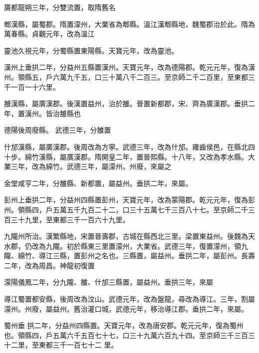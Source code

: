 \begin{pinyinscope}
 廣都龍朔三年，分雙流置，取隋舊名



 郫漢縣，屬蜀郡。隋置濛州，大業省為郫縣。溫江漢郫縣地，魏蜀郡治於此。隋為萬春縣。貞觀元年，改為溫江



 靈池久視元年，分蜀縣置東陽縣。天寶元年，改為靈池。



 漢州上垂拱二年，分益州五縣置漢州。天寶元年，改為德陽郡。乾元元年，復為漢州。領縣五，戶六萬九千五，口三十萬八千二百三。至京師二千二百里，至東都三千一百一十六里。



 雒漢縣，屬廣漢郡。後漢置益州，治於雒。晉置新都郡，宋、齊為廣漢郡。垂拱二年，置漢州。皆治雒縣也



 德陽後周廢縣。
 武德三年，分雒置



 什邡漢縣，屬廣漢郡。後周改為方寧。武德三年，改為什邡。雍齒侯邑，在縣北四十步。綿竹漢縣，屬廣漢郡。隋開皇二年，置晉熙縣。十八年，又改為孝水縣。大業三年，改為綿竹。武德三年，屬濛州。州廢，來屬之



 金堂咸亨二年，分雒縣、新都置，屬益州。垂拱二年，來屬。



 彭州上垂拱二年，分益州四縣置彭州，天寶元年，改為蒙陽郡。乾元元年，復為彭州。領縣四，戶五萬五千九百二十二，口三十五萬七千三百八十七。至京師二千三百三十九里，至東都三千一百六十九里。



 九隴州所治。漢繁縣地，宋置晉壽郡，古城在縣西北三里。梁置東益州。後魏為天水郡，仍改為九隴。初於縣東三里置濛州，大業省。武德三年，復置濛州，領九隴、綿竹、導江三縣，置彭州之名也。三縣置，屬益州。垂拱二年，屬彭州。長壽二年，改為周昌。神龍初復置



 濛陽儀鳳二年，分九隴、雒、什邡三縣置，屬益州。垂拱三年，來屬



 導江蜀置都安縣，後周改為汶山。武德元年，改為盤龍，尋改為導江。三年，割屬濛州。州廢，屬益州。舊治灌口城，武德元年，移治導江郡。垂拱二年，來屬。



 蜀州垂
 拱二年，分益州四縣置。天寶元年，改為唐安郡。乾元元年，復為蜀州也。領縣四，戶五萬六千五百七十七，口三十九萬六百九十四。至京師三千三百三十二里，至東都三千一百七十二
 里。




\end{pinyinscope}
